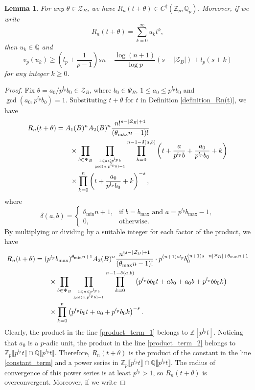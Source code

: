 \documentclass[12pt]{article}
\newtheorem{lemma}[theorem]{Lemma}
\numberwithin{equation}{section}
\begin{document}
\begin{lemma}\label{lemma_u_k}
For any $\theta \in \mathcal{Z}_B$, we have $R_n(t+\theta) \in C^\dagger(\mathbb{Z}_p,\mathbb{Q}_p)$. Moreover, if we write
\[ R_n(t+\theta) = \sum_{k=0}^{\infty} u_k t^{k}, \]
then $u_k \in \mathbb{Q}$ and 
\[ v_p(u_k) \geqslant \left( l_p + \frac{1}{p-1} \right)sn - \frac{\log(n+1)}{\log p}(s-|\mathcal{Z}_B|) +l_p(s+k) \]
for any integer $k \geqslant 0$.
\end{lemma}

\begin{proof}
Fix $\theta = a_0/p^{l_p}b_0 \in \mathcal{Z}_B$, where $b_0 \in \Psi_B$, $1 \leqslant a_0 \leqslant p^{l_p}b_0$ and $\gcd(a_0,p^{l_p}b_0) = 1$. Substituting $t+\theta$ for $t$ in Definition \ref{definition_Rn(t)}, we have
\begin{align*}
	R_n(t+\theta) &= A_1(B)^n A_2(B)^n \frac{n!^{s-|\mathcal{Z}_B|+1}}{(\theta_{\max}n-1)!} \\
	&\qquad\times \prod_{b \in \Psi_B} \prod_{1 \leqslant a \leqslant p^{l_p}b \atop \gcd(a,p^{l_p}b)=1}\prod_{k=0}^{n-1-\delta(a,b)} \left( t+\frac{a}{p^{l_p}b} + \frac{a_0}{p^{l_p}b_{0}} + k \right) \\
	&\qquad\times \prod_{k=0}^{n} \left( t+ \frac{a_0}{p^{l_p}b_{0}} + k \right)^{-s},
\end{align*} 
where
\[ \delta(a,b) = \begin{cases} \theta_{\min}n+1, &\text{if~} b = b_{\max} \text{~and~} a=p^{l_p}b_{\max} - 1, \\  0, &\text{otherwise.}  \end{cases} \]
By multiplying or dividing by a suitable integer for each factor of the product, we have
\begin{align}
	R_n(t+\theta) &= (p^{l_p}b_{\max})^{\theta_{\min}n+1} A_2(B)^n \frac{n!^{s-|\mathcal{Z}_B|+1}}{(\theta_{\max}n-1)!} \cdot p^{(n+1)sl_p} b_0^{(n+1)s - n|\mathcal{Z}_B| + \theta_{\min}n+1} \label{constant_term}\\
	&\qquad\times \prod_{b \in \Psi_B} \prod_{1 \leqslant a \leqslant p^{l_p}b \atop \gcd(a,p^{l_p}b)=1}\prod_{k=0}^{n-1-\delta(a,b)} \left( p^{l_p}bb_0t+ab_0 + a_0b + p^{l_p}bb_0k \right) \label{product_term_1}\\
	&\qquad\times \prod_{k=0}^{n} \left( p^{l_p}b_0t+ a_0 + p^{l_p}b_0k \right)^{-s}. \label{product_term_2}
\end{align}
Clearly, the product in the line \eqref{product_term_1} belongs to $\mathbb{Z}[p^{l_p}t]$. Noticing that $a_0$ is a $p$-adic unit, the product in the line \eqref{product_term_2} belongs to $\mathbb{Z}_p\llbracket p^{l_p}t \rrbracket \cap \mathbb{Q}\llbracket p^{l_p}t \rrbracket$. Therefore, $R_n(t+\theta)$ is the product of the constant in the line \eqref{constant_term} and a power series in $\mathbb{Z}_p\llbracket p^{l_p}t \rrbracket \cap \mathbb{Q}\llbracket p^{l_p}t \rrbracket$. The radius of convergence of this power series is at least $p^{l_p} > 1$, so $R_n(t+\theta)$ is overconvergent. Moreover, if we write

\end{proof}
\end{document}
